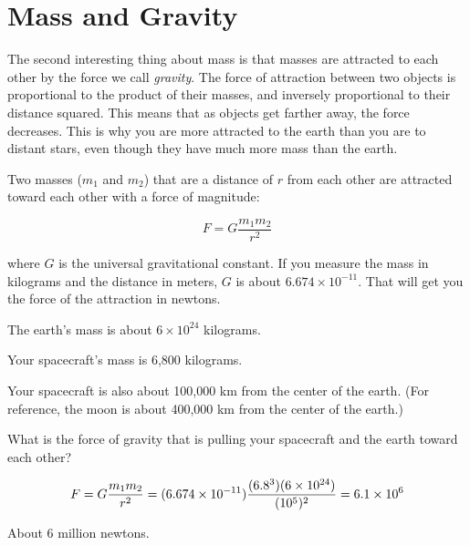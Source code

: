 \section{Mass and Gravity}

The second interesting thing about mass is that masses are
attracted to each other by the force we call \textit{gravity}. The
force of attraction between two objects is proportional to the product
of their masses, and inversely proportional to their distance squared.
This means that as objects get farther away, the force decreases.
This is why you are more attracted to the earth than you are to
distant stars, even though they have much more mass than the earth.

\begin{mdframed}[style=important, frametitle={Newton's Law of Universal Gravitation}]

Two masses ($m_1$ and $m_2$) that are a distance of
$r$ from each other are attracted toward each other with a force of
magnitude:

$$F = G\frac{m_1 m_2}{r^2}$$

where $G$ is the universal gravitational constant. If you measure the
mass in kilograms and the distance in meters, $G$ is about $6.674
\times 10^{-11}$. That will get you the force of the attraction in
newtons.

\end{mdframed}

\begin{Exercise}[title={Gravity}, label=gravity_earth]

  The earth's mass is about $6 \times 10^{24}$ kilograms.

  Your spacecraft's mass is 6,800 kilograms.

  Your spacecraft is also about 100,000 km from the center of the earth. (For reference, the moon is about 400,000 km from the center of the earth.)

  What is the force of gravity that is pulling your spacecraft and the earth toward each other?

\end{Exercise}
\begin{Answer}[ref=gravity_earth]

  $$F = G\frac{m_1 m_2}{r^2} = (6.674 \times 10^{-11})\frac{(6.8 \time 10^3)(6 \times 10^{24})}{(10^5)^2} = 6.1 \times 10^{6}$$

  About 6 million newtons.

\end{Answer}

